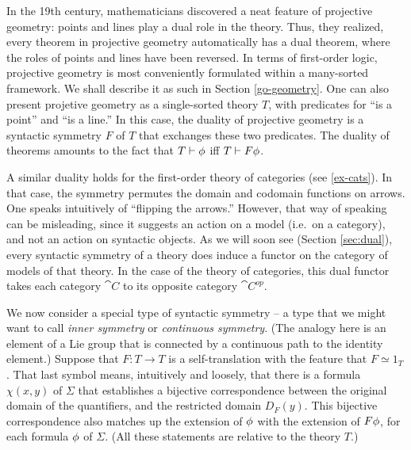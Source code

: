 

\begin{example} In the 19th century, mathematicians discovered a neat
  feature of projective geometry: points and lines play a dual role in
  the theory.  Thus, they realized, every theorem in projective
  geometry automatically has a dual theorem, where the roles of points
  and lines have been reversed.  In terms of first-order logic,
  projective geometry is most conveniently formulated within a
  many-sorted framework.  We shall describe it as such in Section
  \ref{go-geometry}.  One can also present projetive geometry as a
  single-sorted theory $T$, with predicates for ``is a point'' and
  ``is a line.''  In this case, the duality of projective geometry is
  a syntactic symmetry $F$ of $T$ that exchanges these two predicates.
  The duality of theorems amounts to the fact that $T\vdash \phi$ iff
  $T\vdash F\phi$.

  A similar duality holds for the first-order theory of categories
  (see \ref{ex-cats}).  In that case, the symmetry permutes the domain
  and codomain functions on arrows.  One speaks intuitively of
  ``flipping the arrows.''  However, that way of speaking can be
  misleading, since it suggests an action on a model (i.e.\ on a
  category), and not an action on syntactic objects.  As we will soon
  see (Section \ref{sec:dual}), every syntactic symmetry of a theory
  does induce a functor on the category of models of that theory.  In
  the case of the theory of categories, this dual functor takes each
  category $\cat{C}$ to its opposite category
  $\cat{C}^{op}$. \end{example}



We now consider a special type of syntactic symmetry -- a type that we
might want to call \emph{inner symmetry} or \emph{continuous
  symmetry}.  (The analogy here is an element of a Lie group that is
connected by a continuous path to the identity element.)  Suppose that
$F:T\to T$ is a self-translation with the feature that $F\simeq 1_T$.
That last symbol means, intuitively and loosely, that there is a
formula $\chi (x,y)$ of $\Sigma$ that establishes a bijective
correspondence between the original domain of the quantifiers, and the
restricted domain $D_F(y)$.  This bijective correspondence also
matches up the extension of $\phi$ with the extension of $F\phi$, for
each formula $\phi$ of $\Sigma$.  (All these statements are relative to
the theory $T$.)

